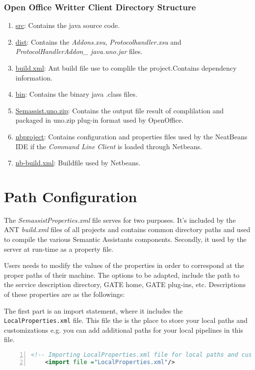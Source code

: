 \subsubsection{Open Office Writter Client Directory Structure}
\begin{enumerate}
\item \url{src}: Contains the java source code.
\item \url{dist}: Contains the \emph{Addons.xsu}, \emph{Protocolhandler.xsu} and \emph{ProtocolHandlerAddon\_ java.uno.jar} files.
\item \url{build.xml}: Ant build file use to complile the project.Contains dependency information.
\item \url{bin}: Contains the binary java .class files.
\item \url{Semassist.uno.zip}: Contains the output file result of complilation and packaged in uno.zip plug-in format used by OpenOffice.
\item \url{nbproject}: Contains configuration and properties files used by the NeatBeans IDE if the \emph{Command Line Client} is loaded through Netbeans.
\item \url{nb-build.xml}: Buildfile used by Netbeans.
\end{enumerate}

\section{Path Configuration}
The \emph{SemassistProperties.xml} file serves for two purposes.
It's included by the ANT \emph{build.xml} files of all projects and contains common directory paths and used to compile the various Semantic Assistants components. Secondly, it used by the server at run-time as a property file.

Users needs to modify the values of the properties in order to correspond at the proper paths of their machine. The options to be adapted, include the path to
the service description directory, GATE home, GATE plug-ins,
etc. Descriptions of these properties are as the followings:

The first part is an import statement, where it includes the \texttt{LocalProperties.xml} file. This file the is the place to store your local paths and customizations e.g. you can add additional paths for your local pipelines in this file.
\begin{lstlisting}[language=XML,numbers=left,xleftmargin=8mm,columns=flexible]
    <!-- Importing LocalProperties.xml file for local paths and customizations -->
    <import file ="LocalProperties.xml"/>
\end{lstlisting}

